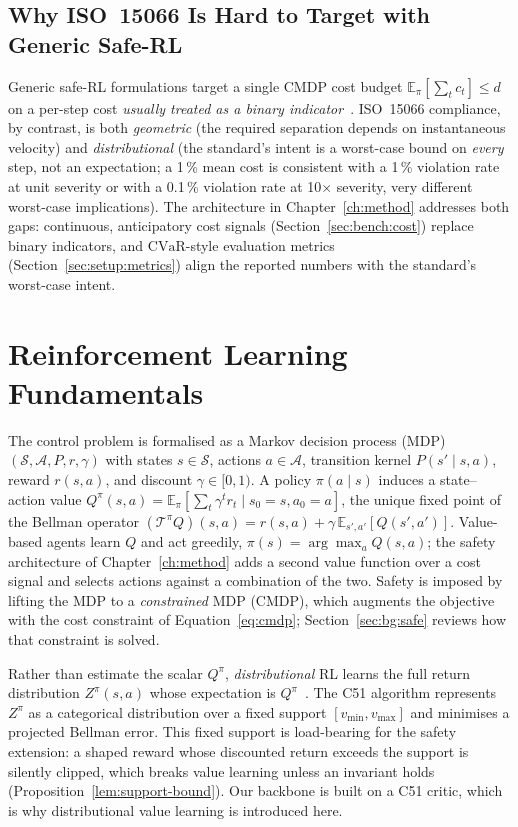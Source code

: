 \documentclass[11pt,a4paper]{report}
\newcommand{\iso}{ISO~15066}
\newcommand{\cvar}{\ensuremath{\mathrm{CVaR}}}
\begin{document}
\subsection{Why \iso{} Is Hard to Target with Generic Safe-RL}
\label{sec:bg:iso:hard}

Generic safe-RL formulations target a single CMDP cost budget
$\mathbb{E}_{\pi}[\sum_t c_t] \le d$ on a per-step cost
\emph{usually treated as a binary indicator}~\cite{ray2019safetygym,
achiam2017cpo,stooke2020pid}. \iso{} compliance, by contrast, is
both \emph{geometric} (the required separation depends on
instantaneous velocity) and \emph{distributional} (the standard's
intent is a worst-case bound on \emph{every} step, not an
expectation; a 1\,\% mean cost is consistent with a 1\,\% violation
rate at unit severity or with a 0.1\,\% violation rate at
10$\times$ severity, very different worst-case implications).
The architecture in Chapter~\ref{ch:method} addresses both gaps:
continuous, anticipatory cost signals
(Section~\ref{sec:bench:cost}) replace binary indicators, and
\cvar-style evaluation metrics (Section~\ref{sec:setup:metrics})
align the reported numbers with the standard's worst-case intent.

\section{Reinforcement Learning Fundamentals}
\label{sec:bg:rl}

The control problem is formalised as a Markov decision process (MDP)
$(\mathcal{S}, \mathcal{A}, P, r, \gamma)$ with states $s \in
\mathcal{S}$, actions $a \in \mathcal{A}$, transition kernel
$P(s' \mid s, a)$, reward $r(s,a)$, and discount $\gamma \in [0,1)$. A
policy $\pi(a \mid s)$ induces a state--action value
$Q^{\pi}(s,a) = \mathbb{E}_{\pi}[\sum_t \gamma^t r_t \mid s_0 = s, a_0 =
a]$, the unique fixed point of the Bellman operator
$(\mathcal{T}^{\pi} Q)(s,a) = r(s,a) + \gamma\,
\mathbb{E}_{s',a'}[Q(s',a')]$. Value-based agents learn $Q$ and act
greedily, $\pi(s) = \arg\max_a Q(s,a)$; the safety architecture of
Chapter~\ref{ch:method} adds a second value function over a cost signal
and selects actions against a combination of the two. Safety is imposed
by lifting the MDP to a \emph{constrained} MDP (CMDP), which augments
the objective with the cost constraint of Equation~\ref{eq:cmdp};
Section~\ref{sec:bg:safe} reviews how that constraint is solved.

Rather than estimate the scalar $Q^{\pi}$, \emph{distributional} RL
learns the full return distribution $Z^{\pi}(s,a)$ whose expectation is
$Q^{\pi}$~\cite{bellemare2017c51}. The C51 algorithm represents
$Z^{\pi}$ as a categorical distribution over a fixed support
$[v_{\min}, v_{\max}]$ and minimises a projected Bellman error. This
fixed support is load-bearing for the safety extension: a shaped reward
whose discounted return exceeds the support is silently clipped, which
breaks value learning unless an invariant holds
(Proposition~\ref{lem:support-bound}). Our backbone is built on a C51
critic, which is why distributional value learning is introduced here.
\end{document}
